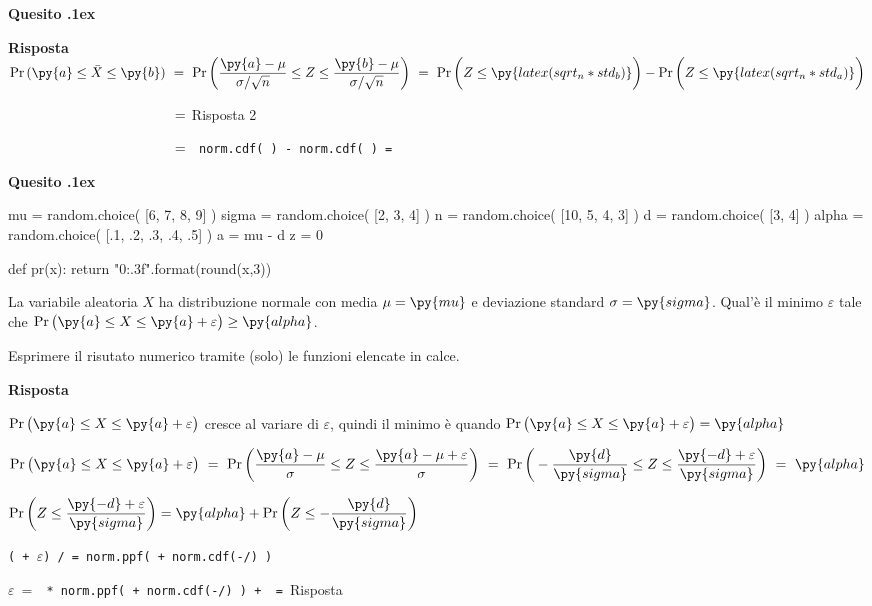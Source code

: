 \documentclass[11pt,twoside,a4paper]{article}
\def\Pr{{\rm Pr\,}}
\newcounter{quesito}
\newenvironment{question}{\addtocounter{quesito}{1}\bigskip\bigskip\par\textbf{Quesito \thequesito.\kern1ex}}{\vspace{\parskip}}
\newenvironment{answer}{\par\textbf{Risposta\quad}}{\vspace{\parskip}}
\begin{document}
\begin{question}
\begin{answer}
$\displaystyle \Pr(\py{a}\le\bar X\le\py{b})
\ =\ 
\Pr\bigg(\dfrac{\py{a}-\mu}{\sigma/\sqrt{n}}\le Z\le\dfrac{\py{b}-\mu}{\sigma/\sqrt{n}}\bigg)\ =\  \Pr\bigg(Z\le\py{latex(sqrt_n*std_b)}\bigg) -  \Pr\bigg(Z\le\py{latex(sqrt_n*std_a)}\bigg)$

$\phantom{\Pr\py{a}\le\bar X\le\py{b})}
\ =\ 
${\hfill Risposta 2}

$\phantom{\Pr\py{a}\le\bar X\le\py{b})}
\ =\ 
${\tt\ norm.cdf(  ) -  norm.cdf(  )
= 
}

\end{answer}
\end{question}



\begin{question} %
\begin{pycode}
mu    = random.choice( [6, 7, 8, 9] )
sigma = random.choice( [2, 3, 4] )
n     = random.choice( [10, 5, 4, 3] )
d     = random.choice( [3, 4] )
alpha = random.choice( [.1, .2, .3, .4, .5] )
a = mu - d 
z = 0

def pr(x):
    return "{0:.3f}".format(round(x,3))
\end{pycode}
La variabile aleatoria $X$ ha distribuzione normale con media $\mu=\py{mu}$ e deviazione standard $\sigma=\py{sigma}$. Qual'è il minimo $\varepsilon$ tale che $\Pr\big(\py{a}\le X\le\py{a}+\varepsilon\big)\ge\py{alpha}$.

Esprimere il risutato numerico tramite (solo) le funzioni elencate in calce. 
\begin{answer}

$\Pr\big(\py{a}\le X\le\py{a}+\varepsilon\big)$ cresce al variare di $\varepsilon$, quindi il minimo è quando $\Pr\big(\py{a}\le X\le\py{a}+\varepsilon\big)=\py{alpha}$\medskip

$\Pr\big(\py{a}\le X\le\py{a}+\varepsilon\big)
\ =\ 
\Pr\bigg(\dfrac{\py{a}-\mu}{\sigma}\le Z\le\dfrac{\py{a}-\mu+\varepsilon}{\sigma}\bigg)
\ =\ 
\Pr\bigg(-\dfrac{\py{d}}{\py{sigma}}\le Z\le\dfrac{\py{-d}+\varepsilon}{\py{sigma}}\bigg)\ =\ \py{alpha}$

$\Pr\bigg(Z\le\dfrac{\py{-d}+\varepsilon}{\py{sigma}}\bigg) = \py{alpha}+\Pr\bigg(Z\le-\dfrac{\py{d}}{\py{sigma}}\bigg)$\medskip

{\tt( + $\varepsilon$) /  = norm.ppf(  + norm.cdf(-/) ) }\medskip

$\varepsilon\ =\ ${\color{blue}\tt  {} * norm.ppf(  + norm.cdf(-/) ) +  }{\tt\ =\ }{\color{blue}\hfill Risposta}

\end{answer}
\end{question}
\end{document}
